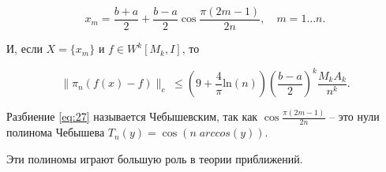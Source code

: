 \begin{equation}\label{eq:27}
x_m = \frac{b+a}{2} + \frac{b-a}{2} \cos \frac{\pi(2m-1)}{2n}, \quad m = 1\dots n.
\end{equation}

И, если $X = \{x_m\}$ и $f \in W^k[M_k, I]$, то 

\begin{equation}
\parallel \pi_n (f(x) -f) \parallel_c \; \leq \left(
9+ \frac{4}{\pi}\mathrm{ln} (n)\right) \left( \frac{b-a}{2}\right)^k \frac{M_kA_k}{n^k}.
\end{equation}

Разбиение \ref{eq:27} называется Чебышевским, так как $\cos \frac{\pi(2m-1)}{2n}$  -- это нули полинома Чебышева $T_n(y) = \cos(n \; arccos(y))$.

Эти полиномы играют большую роль в теории приближений.




